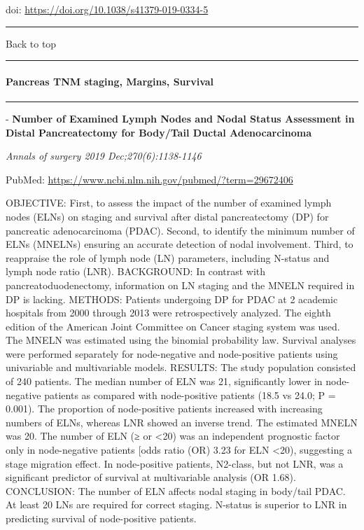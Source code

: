 \documentclass[
]{article}
\renewcommand{\linethickness}{0.05em}
\begin{document}
doi: \url{https://doi.org/10.1038/s41379-019-0334-5}

\begin{center}\rule{0.5\linewidth}{\linethickness}\end{center}

Back to top

\begin{center}\rule{0.5\linewidth}{\linethickness}\end{center}

\pagebreak

\hypertarget{pancreas_staging}{%
\paragraph{Pancreas TNM staging, Margins,
Survival}\label{pancreas_staging}}

\begin{center}\rule{0.5\linewidth}{\linethickness}\end{center}

- \textbf{Number of Examined Lymph Nodes and Nodal Status Assessment in
Distal Pancreatectomy for Body/Tail Ductal Adenocarcinoma}

\emph{Annals of surgery 2019 Dec;270(6):1138-1146}

PubMed: \url{https://www.ncbi.nlm.nih.gov/pubmed/?term=29672406}

OBJECTIVE: First, to assess the impact of the number of examined lymph
nodes (ELNs) on staging and survival after distal pancreatectomy (DP)
for pancreatic adenocarcinoma (PDAC). Second, to identify the minimum
number of ELNs (MNELNs) ensuring an accurate detection of nodal
involvement. Third, to reappraise the role of lymph node (LN)
parameters, including N-status and lymph node ratio (LNR). BACKGROUND:
In contrast with pancreatoduodenectomy, information on LN staging and
the MNELN required in DP is lacking. METHODS: Patients undergoing DP for
PDAC at 2 academic hospitals from 2000 through 2013 were retrospectively
analyzed. The eighth edition of the American Joint Committee on Cancer
staging system was used. The MNELN was estimated using the binomial
probability law. Survival analyses were performed separately for
node-negative and node-positive patients using univariable and
multivariable models. RESULTS: The study population consisted of 240
patients. The median number of ELN was 21, significantly lower in
node-negative patients as compared with node-positive patients (18.5 vs
24.0; P = 0.001). The proportion of node-positive patients increased
with increasing numbers of ELNs, whereas LNR showed an inverse trend.
The estimated MNELN was 20. The number of ELN (≥ or \textless20) was an
independent prognostic factor only in node-negative patients {[}odds
ratio (OR) 3.23 for ELN \textless20), suggesting a stage migration
effect. In node-positive patients, N2-class, but not LNR, was a
significant predictor of survival at multivariable analysis (OR 1.68).
CONCLUSION: The number of ELN affects nodal staging in body/tail PDAC.
At least 20 LNs are required for correct staging. N-status is superior
to LNR in predicting survival of node-positive patients.
\end{document}
